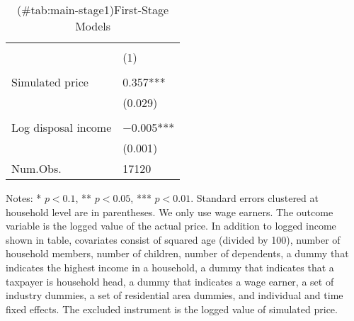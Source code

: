 \begin{table}

\caption{(\#tab:main-stage1)First-Stage Models}
\centering
\fontsize{8}{10}\selectfont
\begin{threeparttable}
\begin{tabular}[t]{l>{\centering\arraybackslash}p{18.75em}}
\toprule
\multicolumn{1}{c}{ } & \multicolumn{1}{c}{Actual price} \\
\cmidrule(l{3pt}r{3pt}){2-2}
  & (1)\\
\midrule
\addlinespace[0.3em]
\multicolumn{2}{l}{\textit{Excluded instruments}}\\
\hspace{1em}Simulated price & \num{0.357}***\\
\hspace{1em} & (\num{0.029})\\
\addlinespace[0.3em]
\multicolumn{2}{l}{\textit{Covariates}}\\
\hspace{1em}Log disposal income & \num{-0.005}***\\
\hspace{1em} & (\num{0.001})\\
\midrule
Num.Obs. & \num{17120}\\
\bottomrule
\end{tabular}
\begin{tablenotes}
\item Notes: * $p < 0.1$, ** $p < 0.05$, *** $p < 0.01$. Standard errors clustered at household level are in parentheses. We only use wage earners. The outcome variable is the logged value of the actual price. In addition to logged income shown in table, covariates consist of squared age (divided by 100), number of household members, number of children, number of dependents, a dummy that indicates the highest income in a household, a dummy that indicates that a taxpayer is household head, a dummy that indicates a wage earner, a set of industry dummies, a set of residential area dummies, and individual and time fixed effects. The excluded instrument is the logged value of simulated price.
\end{tablenotes}
\end{threeparttable}
\end{table}
